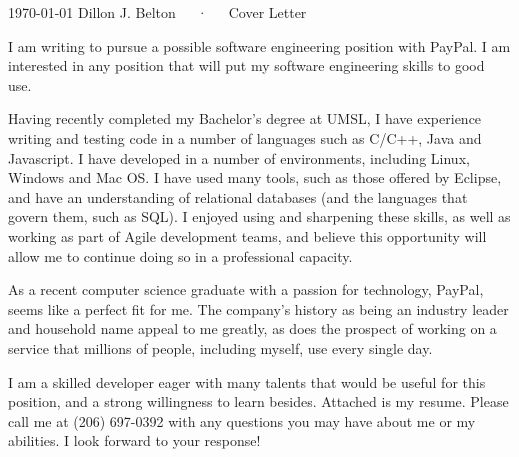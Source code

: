 \documentclass[11pt, a4paper]{awesome-cv}
\newcommand{\companyname}{PayPal}
\begin{document}
\makecvheader

\makecvfooter
  {\today}
  {Dillon J. Belton~~~·~~~Cover Letter}
  {}

\makelettertitle

\begin{cvletter}

I am writing to pursue a possible software engineering position with \companyname. I am interested in any position that will put my software engineering skills to good use.

Having recently completed my Bachelor's degree at UMSL, I have experience writing and testing code in a number of languages such as C/C++, Java and Javascript. I have developed in a number of environments, including Linux, Windows and Mac OS. I have used many tools, such as those offered by Eclipse, and have an understanding of relational databases (and the languages that govern them, such as SQL). I enjoyed using and sharpening these skills, as well as working as part of Agile development teams, and believe this opportunity will allow me to continue doing so in a professional capacity.

\lettersection{Why \companyname?}
As a recent computer science graduate with a passion for technology, \companyname, seems like a perfect fit for me. The company's history as being an industry leader and household name appeal to me greatly, as does the prospect of working on a service that millions of people, including myself, use every single day. 

I am a skilled developer eager with many talents that would be useful for this position, and a strong willingness to learn besides.
Attached is my resume. Please call me at (206) 697-0392 with any questions you may have about me or my abilities. I look forward to your response!

\end{cvletter}


\makeletterclosing
\end{document}
